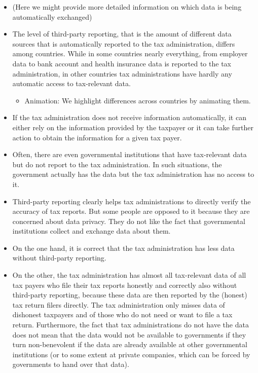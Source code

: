 \documentclass[11pt]{article}
\begin{document}
\begin{itemize}
    \begin{itemize}
        \item We change the country we refer to depending on where we conduct the survey.
    \end{itemize}
    \item (Here we might provide more detailed information on which data is being automatically exchanged)
    \item The level of third-party reporting, that is the amount of different data sources that is automatically reported to the tax administration, differs among countries. While in some countries nearly everything, from employer data to bank account and health insurance data is reported to the tax administration, in other countries tax administrations have hardly any automatic access to tax-relevant data.
    \begin{itemize}
        \item Animation: We highlight differences across countries by animating them. 
    \end{itemize}
    \item If the tax administration does not receive information automatically, it can either rely on the information provided by the taxpayer or it can take further action to obtain the information for a given tax payer. 
    \item Often, there are even governmental institutions that have tax-relevant data but do not report to the tax administration. In such situations, the government actually has the data but the tax administration has no access to it.
    \item Third-party reporting clearly helps tax administrations to directly verify the accuracy of tax reports. But some people are opposed to it because they are concerned about data privacy. They do not like the fact that governmental institutions collect and exchange data about them.
    \item On the one hand, it is correct that the tax administration has less data without third-party reporting.
    \item On the other, the tax administration has almost all tax-relevant data of all tax payers who file their tax reports honestly and correctly also without third-party reporting, because these data are then reported by the (honest) tax return filers directly. The tax administration only misses data of dishonest taxpayers and of those who do not need or want to file a tax return. Furthermore, the fact that tax administrations do not have the data does not mean that the data would not be available to governments if they turn non-benevolent if the data are already available at other governmental institutions (or to some extent at private companies, which can be forced by governments to hand over that data).
\end{itemize}
\end{document}
